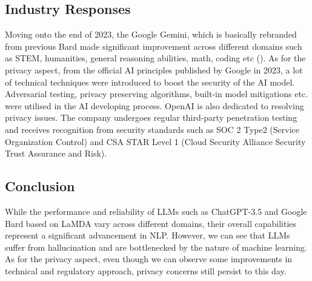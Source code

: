 \subsection{Industry Responses}

Moving onto the end of 2023, the Google Gemini, which is basically rebranded from previous Bard made significant improvement across different domains such as STEM, humanities, general reasoning abilities, math, coding etc (\cite{Pichai2023}). As for the privacy aspect, from the official AI principles published by Google in 2023, a lot of technical techniques were introduced to boost the security of the AI model. Adversarial testing, privacy preserving algorithms, built-in model mitigations etc. were utilised in the AI developing process. OpenAI is also dedicated to resolving privacy issues. The company undergoes regular third-party penetration testing and receives recognition from security standards such as SOC 2 Type2 (Service Organization Control) and CSA STAR Level 1 (Cloud Security Alliance Security Trust Assurance and Risk).

\subsection{Conclusion}

While the performance and reliability of LLMs such as ChatGPT-3.5 and Google Bard based on LaMDA vary across different domains, their overall capabilities represent a significant advancement in NLP. However, we can see that LLMs suffer from hallucination and are bottlenecked by the nature of machine learning. As for the privacy aspect, even though we can observe some improvements in technical and regulatory approach, privacy concerns still persist to this day.

